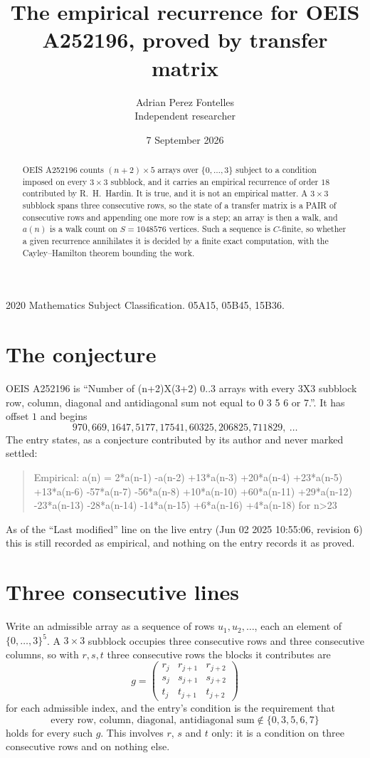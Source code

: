 \documentclass[11pt,a4paper]{article}
\title{The empirical recurrence for OEIS A252196, proved by transfer matrix}
\author{Adrian Perez Fontelles\\ \small Independent researcher}
\date{7 September 2026}
\theoremstyle{plain}
\theoremstyle{definition}
\begin{document}
\maketitle

\begin{abstract}
OEIS A252196 counts $(n+2)\times5$ arrays over $\{0,\dots,3\}$ subject to a condition imposed on
every $3\times3$ subblock, and it carries an empirical recurrence of order $18$
contributed by R.~H.~Hardin. It is true, and it is not an empirical matter. A $3\times3$
subblock spans three consecutive rows, so the state of a transfer matrix is a PAIR of
consecutive rows and appending one more row is a step; an array is then a walk, and
$a(n)$ is a walk count on $S=1048576$ vertices. Such a sequence is $C$-finite, so whether a given
recurrence annihilates it is decided by a finite exact computation, with the Cayley--Hamilton
theorem bounding the work.
\end{abstract}

\noindent\small 2020 Mathematics Subject Classification. 05A15, 05B45, 15B36.\normalsize

\section{The conjecture}

OEIS A252196 is ``Number of (n+2)X(3+2) 0..3 arrays with every 3X3 subblock row, column, diagonal and antidiagonal sum not equal to 0 3 5 6 or 7.''. It has offset $1$ and begins
\[
970, 669, 1647, 5177, 17541, 60325, 206825, 711829,\ \dots
\]
The entry states, as a conjecture contributed by its author and never marked settled:
\begin{quote}
Empirical: a(n) = 2*a(n-1) -a(n-2) +13*a(n-3) +20*a(n-4) +23*a(n-5) +13*a(n-6) -57*a(n-7) -56*a(n-8) +10*a(n-10) +60*a(n-11) +29*a(n-12) -23*a(n-13) -28*a(n-14) -14*a(n-15) +6*a(n-16) +4*a(n-18) for n>23
\end{quote}
As of the ``Last modified'' line on the live entry (Jun 02 2025 10:55:06, revision 6) this is still
recorded as empirical, and nothing on the entry records it as proved.

\section{Three consecutive lines}

Write an admissible array as a sequence of rows $u_1,u_2,\dots$, each an element of
$\{0,\dots,3\}^{5}$. A $3\times3$ subblock occupies three consecutive rows and
three consecutive columns, so with $r,s,t$ three consecutive rows the blocks it
contributes are
\[
g=\begin{pmatrix}r_j&r_{j+1}&r_{j+2}\\ s_j&s_{j+1}&s_{j+2}\\ t_j&t_{j+1}&t_{j+2}\end{pmatrix}
\]
for each admissible index, and the entry's condition is the requirement that
\[
\text{every row, column, diagonal, antidiagonal sum} \notin \{0,3,5,6,7\}
\]
holds for every such $g$. This involves $r$, $s$ and $t$ only: it is a condition on
three consecutive rows and on nothing else.
\end{document}
